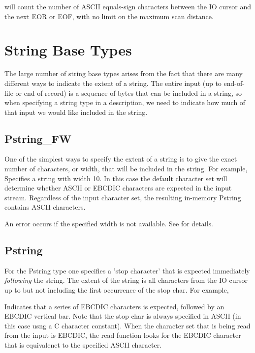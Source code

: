 %
\noindent
will count the number of ASCII equals-sign characters between
the IO cursor and the next EOR or EOF, with no limit on
the maximum scan distance.

\section{String Base Types}

The large number of string base types arises from the fact that there
are many different ways to indicate the extent of a string.  The
entire input (up to end-of-file or end-of-record) is a sequence of
bytes that can be included in a string, so when specifying a string
type in a \padsl{} description, we need to indicate how much of that
input we would like included in the string.

\subsection{Pstring\_FW}

\aedBegin{}
\aedEnd{}

One of the simplest ways to specify the extent of a string is to give the
exact number of characters, or width, that will be included in the string.
For example,
%
\noindent
Specifies a string with width 10.  In this case the default character set
will determine whether ASCII or EBCDIC characters are expected in the
input stream.  Regardless of the input character set, the resulting in-memory 
Pstring contains ASCII characters. 

An error occurs if the specified width is not available.  See 
for details.

\subsection{Pstring}

\aedBegin{}
\aedEnd{}

For the Pstring type one specifies a 'stop character' that is
expected immediately {\em following\/} the string.  The extent of the
string is all characters from the IO cursor up
to but not including the first occurrence of the stop char.
For example,

%
\noindent
Indicates that a series of EBCDIC characters is expected, followed by
an EBCDIC vertical bar.  Note that the stop char is always specified
in ASCII (in this case usng a C character constant).  When the
character set that is being read from the input is EBCDIC, the read
function looks for the EBCDIC character that is equivalenet to the
specified ASCII character.

